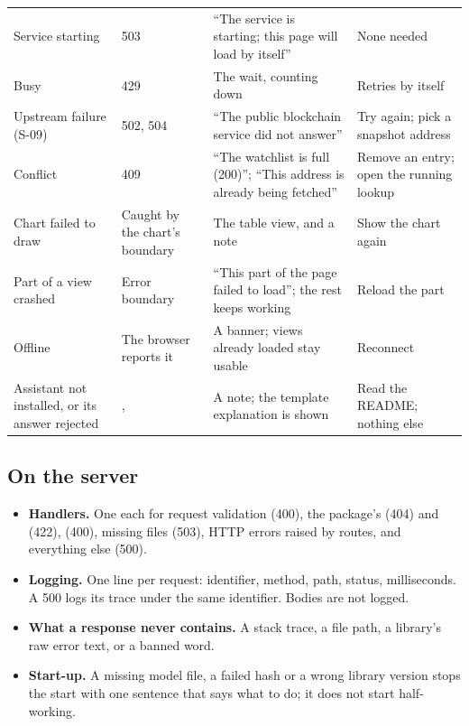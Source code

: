 {\begin{longtable}{@{}L{2.9cm}L{2.7cm}L{4.9cm}L{3.6cm}@{}}
Service starting & 503 & ``The service is starting; this page will load by itself'' & None needed \\
Busy & 429 & The wait, counting down & Retries by itself \\
Upstream failure (S-09) & 502, 504 & ``The public blockchain service did not answer'' & Try again; pick a snapshot address \\
Conflict & 409 & ``The watchlist is full (200)''; ``This address is already being fetched'' & Remove an entry; open the running lookup \\
Chart failed to draw & Caught by the chart's boundary & The table view, and a note & Show the chart again \\
Part of a view crashed & Error boundary & ``This part of the page failed to load''; the rest keeps working & Reload the part \\
Offline & The browser reports it & A banner; views already loaded stay usable & Reconnect \\
Assistant not installed, or its answer rejected & ,  & A note; the template explanation is shown & Read the README; nothing else \\
\bottomrule
\end{longtable}
}

\subsection{On the server}

\begin{itemize}
  \item \textbf{Handlers.} One each for request validation (400), the package's
     (404) and  (422),  (400),
    missing files (503), HTTP errors raised by routes, and everything else (500).
  \item \textbf{Logging.} One line per request: identifier, method, path, status, milliseconds.
    A 500 logs its trace under the same identifier. Bodies are not logged.
  \item \textbf{What a response never contains.} A stack trace, a file path, a library's raw
    error text, or a banned word.
  \item \textbf{Start-up.} A missing model file, a failed hash or a wrong library version stops the
    start with one sentence that says what to do; it does not start half-working.
\end{itemize}

